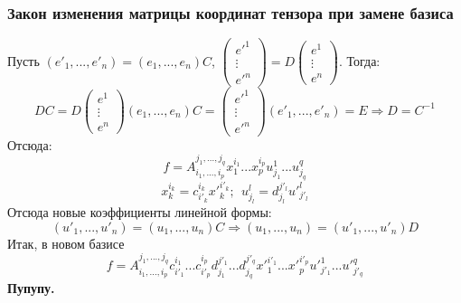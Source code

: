 \subsubsection*{Закон изменения матрицы координат тензора при замене базиса}
Пусть $(e'_1,...,e'_n) = (e_1,...,e_n)C$, $\begin{pmatrix} e'^1 \\ \vdots \\ e'^n \end{pmatrix} = D\begin{pmatrix} e^1 \\ \vdots \\ e^n \end{pmatrix}$. Тогда:
\[DC = D\begin{pmatrix} e^1 \\ \vdots \\ e^n \end{pmatrix}(e_1,...,e_n)C = \begin{pmatrix} e'^1 \\ \vdots \\ e'^n \end{pmatrix}(e'_1,...,e'_n) = E \Rightarrow D = C^{-1}\]
Отсюда:
\[f = A_{i_1,...,i_p}^{j_1,...,j_q}x_1^{i_1}...x_p^{i_p}u_{j_1}^1...u_{j_q}^q\]
\[x_k^{i_k} = c_{i'_k}^{i_k}{x'}^{i'_k}_k; \ \ u_{j_l}^{l} = d_{j_l}^{j'_l}u'^l_{j'_l}\]
Отсюда новые коэффициенты линейной формы:
\[(u'_1,...,u'_n) = (u_1,...,u_n)C \Longrightarrow (u_1,...,u_n) = (u'_1,...,u'_n)D\]
Итак, в новом базисе
\[f = A_{i_1,...,i_p}^{j_1,...,j_q} c_{i'_1}^{i_1}...c_{i'_p}^{i_p}d_{j_1}^{j'_1}...d_{j_q}^{j'_q}{x'}^{i'_1}_1...{x'}^{i'_p}_p {u'}^{1}_{j'_1}...{u'}^{q}_{j'_q}\]
\textbf{Пупупу.}
